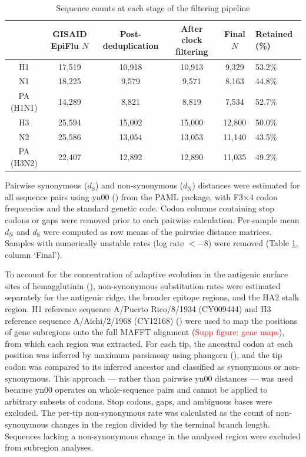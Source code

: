 \documentclass{pnas-new}
\begin{document}
\begin{table}[H]
    \centering
\caption{Sequence counts at each stage of the filtering pipeline}
\label{tab:sequences}
    \begin{tabular}{c|ccccl}\toprule
         \multicolumn{1}{c}{} &  GISAID EpiFlu $N$&  Post-deduplication&  After clock filtering& Final $N$ &Retained (\%)\\\midrule
         H1&  17,519&  10,918&  10,913&  9,329&53.2\%\\
         N1&  18,225&  9,579&  9,571&  8,163&44.8\%\\
         PA (H1N1)&  14,289&  8,821&  8,819&  7,534&52.7\%\\
         H3&  25,594&  15,002&  15,000&  12,800&50.0\%\\
         N2&  25,586&  13,054&  13,053&  11,140&43.5\%\\
         PA (H3N2)&  22,407&  12,892&  12,890&  11,035&49.2\%\\ \bottomrule
    \end{tabular}
    
    
\end{table}

Pairwise synonymous ($d_\text{S}$) and non-synonymous ($d_\text{N}$) distances were estimated for all sequence pairs using yn00 (\cite{yang_estimating_2000}) from the PAML package, with F3$\times$4 codon frequencies and the standard genetic code. Codon columns containing stop codons or gaps were removed prior to each pairwise calculation. Per-sample mean $d_\text{N}$ and $d_\text{S}$ were computed as row means of the pairwise distance matrices. Samples with numerically unstable rates (log rate $< -$8) were removed (Table \ref{tab:sequences}, column `Final').

To account for the concentration of adaptive evolution in the antigenic surface sites of hemagglutinin (\cite{bush_positive_1999}), non-synonymous substitution rates were estimated separately for the antigenic ridge, the broader epitope regions, and the HA2 stalk region. H1 reference sequence A/Puerto Rico/8/1934 (CY009444) and H3 reference sequence A/Aichi/2/1968 (CY12168) (\cite{bao_influenza_2008}) were used to map the positions of gene subregions onto the full MAFFT alignment (\textcolor{red}{Supp figure: gene maps}), from which each region was extracted. For each tip, the ancestral codon at each position was inferred by maximum parsimony using phangorn (\cite{schliep_phangorn_2011}), and the tip codon was compared to its inferred ancestor and classified as synonymous or non-synonymous. This approach — rather than pairwise yn00 distances — was used because yn00 operates on whole-sequence pairs and cannot be applied to arbitrary subsets of codons. Stop codons, gaps, and ambiguous bases were excluded. The per-tip non-synonymous rate was calculated as the count of non-synonymous changes in the region divided by the terminal branch length. Sequences lacking a non-synonymous change in the analysed region were excluded from subregion analyses.
\end{document}
